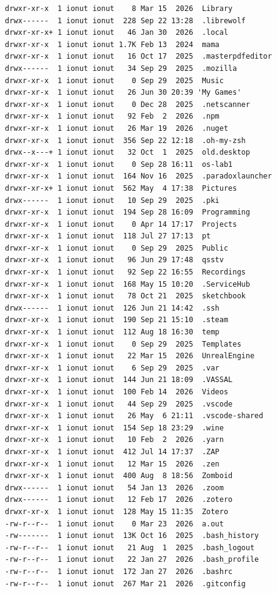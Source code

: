 \documentclass{labreport}
\begin{document}
\begin{lstlisting}[style=bash]
drwxr-xr-x  1 ionut ionut    8 Mar 15  2026  Library
drwx------  1 ionut ionut  228 Sep 22 13:28  .librewolf
drwxr-xr-x+ 1 ionut ionut   46 Jan 30  2026  .local
drwxr-xr-x  1 ionut ionut 1.7K Feb 13  2024  mama
drwxr-xr-x  1 ionut ionut   16 Oct 17  2025  .masterpdfeditor
drwx------  1 ionut ionut   34 Sep 29  2025  .mozilla
drwxr-xr-x  1 ionut ionut    0 Sep 29  2025  Music
drwxr-xr-x  1 ionut ionut   26 Jun 30 20:39 'My Games'
drwxr-xr-x  1 ionut ionut    0 Dec 28  2025  .netscanner
drwxr-xr-x  1 ionut ionut   92 Feb  2  2026  .npm
drwxr-xr-x  1 ionut ionut   26 Mar 19  2026  .nuget
drwxr-xr-x  1 ionut ionut  356 Sep 22 12:18  .oh-my-zsh
drwx--x---+ 1 ionut ionut   32 Oct  1  2025  old.desktop
drwxr-xr-x  1 ionut ionut    0 Sep 28 16:11  os-lab1
drwxr-xr-x  1 ionut ionut  164 Nov 16  2025  .paradoxlauncher
drwxr-xr-x+ 1 ionut ionut  562 May  4 17:38  Pictures
drwx------  1 ionut ionut   10 Sep 29  2025  .pki
drwxr-xr-x  1 ionut ionut  194 Sep 28 16:09  Programming
drwxr-xr-x  1 ionut ionut    0 Apr 14 17:17  Projects
drwxr-xr-x  1 ionut ionut  118 Jul 27 17:13  pt
drwxr-xr-x  1 ionut ionut    0 Sep 29  2025  Public
drwxr-xr-x  1 ionut ionut   96 Jun 29 17:48  qsstv
drwxr-xr-x  1 ionut ionut   92 Sep 22 16:55  Recordings
drwxr-xr-x  1 ionut ionut  168 May 15 10:20  .ServiceHub
drwxr-xr-x  1 ionut ionut   78 Oct 21  2025  sketchbook
drwx------  1 ionut ionut  126 Jun 21 14:42  .ssh
drwxr-xr-x  1 ionut ionut  190 Sep 21 15:10  .steam
drwxr-xr-x  1 ionut ionut  112 Aug 18 16:30  temp
drwxr-xr-x  1 ionut ionut    0 Sep 29  2025  Templates
drwxr-xr-x  1 ionut ionut   22 Mar 15  2026  UnrealEngine
drwxr-xr-x  1 ionut ionut    6 Sep 29  2025  .var
drwxr-xr-x  1 ionut ionut  144 Jun 21 18:09  .VASSAL
drwxr-xr-x  1 ionut ionut  100 Feb 14  2026  Videos
drwxr-xr-x  1 ionut ionut   44 Sep 29  2025  .vscode
drwxr-xr-x  1 ionut ionut   26 May  6 21:11  .vscode-shared
drwxr-xr-x  1 ionut ionut  154 Sep 18 23:29  .wine
drwxr-xr-x  1 ionut ionut   10 Feb  2  2026  .yarn
drwxr-xr-x  1 ionut ionut  412 Jul 14 17:37  .ZAP
drwxr-xr-x  1 ionut ionut   12 Mar 15  2026  .zen
drwxr-xr-x  1 ionut ionut  400 Aug  8 18:56  Zomboid
drwx------  1 ionut ionut   54 Jan 13  2026  .zoom
drwx------  1 ionut ionut   12 Feb 17  2026  .zotero
drwxr-xr-x  1 ionut ionut  128 May 15 11:35  Zotero
-rw-r--r--  1 ionut ionut    0 Mar 23  2026  a.out
-rw-------  1 ionut ionut  13K Oct 16  2025  .bash_history
-rw-r--r--  1 ionut ionut   21 Aug  1  2025  .bash_logout
-rw-r--r--  1 ionut ionut   22 Jan 27  2026  .bash_profile
-rw-r--r--  1 ionut ionut  172 Jan 27  2026  .bashrc
-rw-r--r--  1 ionut ionut  267 Mar 21  2026  .gitconfig

\end{lstlisting}
\end{document}
